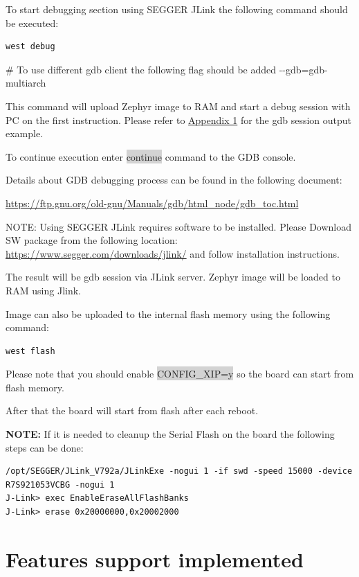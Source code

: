 \documentclass[11pt,a4paper,oneside]{article}
\begin{document}
To start debugging section using SEGGER JLink the following command
should be executed:

\begin{lstlisting}
west debug
\end{lstlisting}

\# To use different gdb client the following flag should be added
-\/-gdb=gdb-multiarch

This command will upload Zephyr image to RAM and start a debug session
with PC on the first instruction. Please refer to
\hyperref[appendix-1.-gdb-debug-session-output]{Appendix 1} for the gdb
session output example.

To continue execution enter \colorbox{lightgray}{continue} command to the GDB console.

Details about GDB debugging process can be found in the following
document:

\url{https://ftp.gnu.org/old-gnu/Manuals/gdb/html_node/gdb_toc.html}

NOTE: Using SEGGER JLink requires software to be installed. Please
Download SW package from the following location:
\url{https://www.segger.com/downloads/jlink/} and follow installation
instructions.

The result will be gdb session via JLink server. Zephyr image will be
loaded to RAM using Jlink.

Image can also be uploaded to the internal flash memory using the
following command:

\begin{lstlisting}
west flash
\end{lstlisting}

Please note that you should enable \colorbox{lightgray}{CONFIG\_XIP=y} so the board can
start from flash memory.

After that the board will start from flash after each reboot.

\textbf{NOTE:} If it is needed to cleanup the Serial Flash on the board the following
steps can be done:

\begin{lstlisting}
/opt/SEGGER/JLink_V792a/JLinkExe -nogui 1 -if swd -speed 15000 -device
R7S921053VCBG -nogui 1
J-Link> exec EnableEraseAllFlashBanks
J-Link> erase 0x20000000,0x20002000
\end{lstlisting}

\section{Features support implemented}\label{features-support-implemented}
\end{document}
